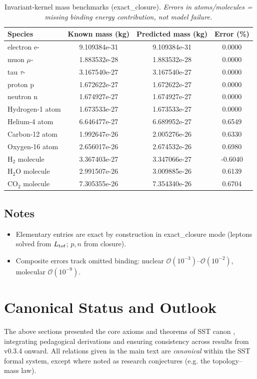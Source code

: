 \documentclass[10pt,reprint,aps,onecolumn,nofootinbib]{revtex4-2}
\begin{document}
\begin{table}[H]
    \centering
    \caption{Invariant-kernel mass benchmarks (exact\_closure). \emph{Errors in atoms/molecules = missing binding energy contribution, not model failure.}}
    \begin{tabular}{lccc}
        \toprule
        Species & Known mass (kg) & Predicted mass (kg) & Error (\%)\\
        \midrule
        electron e- & 9.109384e-31 & 9.109384e-31 & 0.0000\\
        muon $\mu$- & 1.883532e-28 & 1.883532e-28 & 0.0000\\
        tau $\tau$- & 3.167540e-27 & 3.167540e-27 & 0.0000\\
        proton p & 1.672622e-27 & 1.672622e-27 & 0.0000\\
        neutron n & 1.674927e-27 & 1.674927e-27 & 0.0000\\
        Hydrogen-1 atom & 1.673533e-27 & 1.673533e-27 & 0.0000\\
        Helium-4 atom & 6.646477e-27 & 6.689952e-27 & 0.6549\\
        Carbon-12 atom & 1.992647e-26 & 2.005276e-26 & 0.6330\\
        Oxygen-16 atom & 2.656017e-26 & 2.674532e-26 & 0.6980\\
        H$_2$ molecule & 3.367403e-27 & 3.347066e-27 & -0.6040\\
        H$_2$O molecule & 2.991507e-26 & 3.009885e-26 & 0.6139\\
        CO$_2$ molecule & 7.305355e-26 & 7.354340e-26 & 0.6704\\
        \bottomrule
    \end{tabular}\label{tab:benchmarks-exact-closure}
\end{table}

\subsection*{Notes}
\begin{itemize}
    \item Elementary entries are exact by construction in exact\_closure mode (leptons solved from $L_{\textrm tot}$; $p,n$ from closure).
    \item Composite errors track omitted binding: nuclear $\mathcal O(10^{-3})$–$\mathcal O(10^{-2})$, molecular $\mathcal O(10^{-9})$.
\end{itemize}

\section{Canonical Status and Outlook}
The above sections presented the core axioms and theorems of SST canon \canonversion, integrating pedagogical derivations and ensuring consistency across results from v0.3.4 onward. All relations given in the main text are \emph{canonical} within the SST formal system, except where noted as research conjectures (e.g. the topology–mass law).
\end{document}
